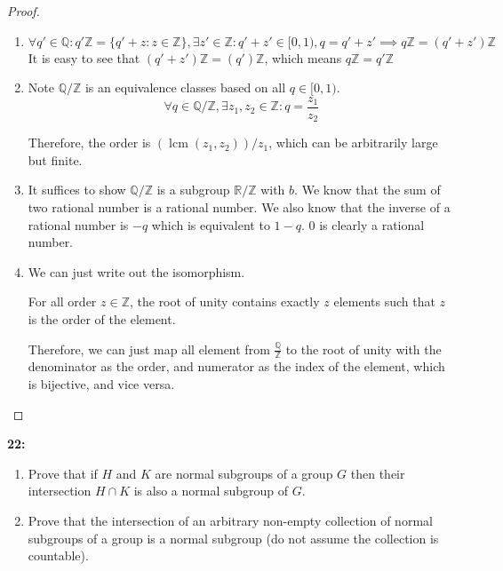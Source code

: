 \documentclass[11pt]{article}
\newcommand{\Q}{\mathbb{Q}}
\newcommand{\R}{\mathbb{R}}
\newcommand{\Z}{\mathbb{Z}}
\newenvironment{exercise}[1]
	{\noindent \textbf{#1:}}
	{\par \vspace{0.5\baselineskip}}
\begin{document}
\begin{proof}
	\begin{enumerate}[label=\emph{\alph*}]
		\item \[
			      \forall q' \in \Q: q'\Z = \{q'+z : z \in \Z\}, \exists z' \in \Z: q'+z' \in [0,1), q = q'+z' \implies q\Z = (q'+z')\Z
		      \]
		      It is easy to see that $(q'+z')\Z = (q')\Z$, which means $q\Z=q'\Z$
		\item Note $\Q/\Z$ is an equivalence classes based on all $q \in [0,1)$.
		      \[
			      \forall q \in \Q/\Z, \exists z_1,z_2 \in \Z: q = \frac{z_1}{z_2}
		      \]

		      Therefore, the order is $(\operatorname{lcm} (z_1,z_2))/z_1$, which can be arbitrarily large but finite.

		\item It suffices to show $\Q/\Z$ is a subgroup $\R/\Z$ with $b$.
		      We know that the sum of two rational number is a rational number.
		      We also know that the inverse of a rational number is $-q$ which is equivalent to $1-q$.
		      $0$ is clearly a rational number.
		\item We can just write out the isomorphism.

		      For all order $z \in \Z$, the root of unity contains exactly $z$ elements such that $z$ is the order of the element.

		      Therefore, we can just map all element from $\frac{\Q}{\Z}$ to the root of unity with the denominator as the order,
		      and numerator as the index of the element, which is bijective, and vice versa.

	\end{enumerate}
\end{proof}

\begin{exercise}{22}
	\begin{enumerate}[label=\emph{\alph*}]
		\item \textsf{Prove that if \(H\) and \(K\) are normal subgroups of a group \(G\) then their intersection \(H \cap K\) is also a normal subgroup of \(G\).}
		\item \textsf{Prove that the intersection of an arbitrary non-empty collection of normal subgroups of a group is a normal subgroup (do not assume the collection is countable).}
	\end{enumerate}
\end{exercise}{}
\end{document}
